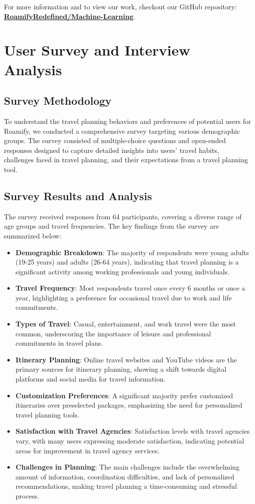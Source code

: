 \documentclass[conference]{IEEEtran}
\begin{document}
For more information and to view our work, checkout our GitHub repository: \href{https://github.com/RoamifyRedefined/Machine-Learning}{\textbf{RoamifyRedefined/Machine-Learning}}.

\section{User Survey and Interview Analysis}

\subsection{Survey Methodology}
To understand the travel planning behaviors and preferences of potential users for Roamify, we conducted a comprehensive survey targeting various demographic groups. The survey consisted of multiple-choice questions and open-ended responses designed to capture detailed insights into users' travel habits, challenges faced in travel planning, and their expectations from a travel planning tool.

\subsection{Survey Results and Analysis}
The survey received responses from 64 participants, covering a diverse range of age groups and travel frequencies. The key findings from the survey are summarized below:

\begin{itemize}
    \item \textbf{Demographic Breakdown}: The majority of respondents were young adults (19-25 years) and adults (26-64 years), indicating that travel planning is a significant activity among working professionals and young individuals.
    \item \textbf{Travel Frequency}: Most respondents travel once every 6 months or once a year, highlighting a preference for occasional travel due to work and life commitments.
    \item \textbf{Types of Travel}: Casual, entertainment, and work travel were the most common, underscoring the importance of leisure and professional commitments in travel plans.
    \item \textbf{Itinerary Planning}: Online travel websites and YouTube videos are the primary sources for itinerary planning, showing a shift towards digital platforms and social media for travel information.
    \item \textbf{Customization Preferences}: A significant majority prefer customized itineraries over preselected packages, emphasizing the need for personalized travel planning tools.
    \item \textbf{Satisfaction with Travel Agencies}: Satisfaction levels with travel agencies vary, with many users expressing moderate satisfaction, indicating potential areas for improvement in travel agency services.
    \item \textbf{Challenges in Planning}: The main challenges include the overwhelming amount of information, coordination difficulties, and lack of personalized recommendations, making travel planning a time-consuming and stressful process.
\end{itemize}
\end{document}
